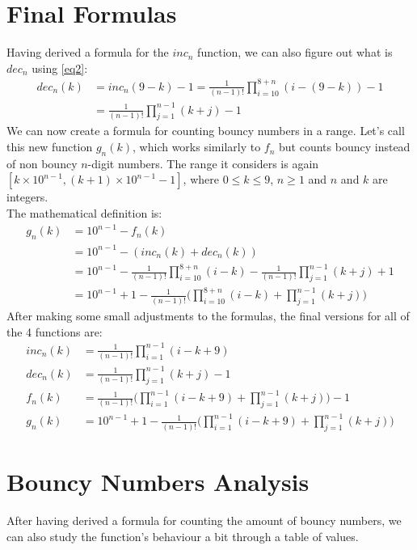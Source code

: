 \documentclass[titlepage,12pt]{article}
\begin{document}
\section{Final Formulas}
Having derived a formula for the $inc_n$ function, we can also figure out what is $dec_n$ using \ref{eq2}:
\begin{align*}
    dec_n(k) &= inc_n(9-k) - 1 = \frac{1}{(n-1)!} \prod_{i=10}^{8+n} (i-(9-k)) - 1\\
    &= \frac{1}{(n-1)!} \prod_{j=1}^{n-1} (k+j) - 1
\end{align*}
\noindent
We can now create a formula for counting bouncy numbers in a range. Let's call this new function $g_n(k)$, which works similarly to $f_n$ but counts bouncy instead of non bouncy $n$-digit numbers. The range it considers is again $[k\times10^{n-1}, (k+1)\times10^{n-1}-1]$, where $0 \leq k \leq 9$, $n \geq 1$ and $n$ and $k$ are integers.\\
The mathematical definition is:
\begin{align*}
    g_n(k) &= 10^{n-1} - f_n(k)\\
    &= 10^{n-1} - (inc_n(k) + dec_n(k))\\
    &= 10^{n-1} - \frac{1}{(n-1)!} \prod_{i=10}^{8+n} (i-k) - \frac{1}{(n-1)!} \prod_{j=1}^{n-1} (k+j) + 1\\
    &= 10^{n-1} + 1 - \frac{1}{(n-1)!} \Bigg(\prod_{i=10}^{8+n} (i-k) + \prod_{j=1}^{n-1} (k+j) \Bigg)
\end{align*}
After making some small adjustments to the formulas, the final versions for all of the 4 functions are:
\begin{align}
    inc_n(k) &= \frac{1}{(n-1)!} \prod_{i=1}^{n-1} (i-k+9) \label{eq8} \\
    dec_n(k) &= \frac{1}{(n-1)!} \prod_{j=1}^{n-1} (k+j) - 1 \label{eq9}\\
    f_n(k) &= \frac{1}{(n-1)!} \Bigg(\prod_{i=1}^{n-1} (i-k+9) + \prod_{j=1}^{n-1} (k+j) \Bigg) - 1 \label{eq10}\\
    g_n(k) &= 10^{n-1} + 1 - \frac{1}{(n-1)!} \Bigg(\prod_{i=1}^{n-1} (i-k+9) + \prod_{j=1}^{n-1} (k+j) \Bigg) \label{eq11}
\end{align}

\newpage

\section{Bouncy Numbers Analysis}
After having derived a formula for counting the amount of bouncy numbers, we can also study the function's behaviour a bit through a table of values.\\
\end{document}
